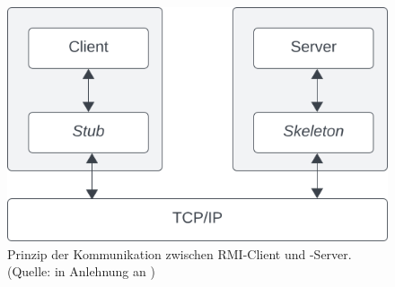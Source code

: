 \begin{figure}
    \centering
    \includegraphics[scale=0.4]{chapters/fopt5/img/rmi/stubskeleton}
    \caption{Prinzip der Kommunikation zwischen RMI-Client und -Server. (Quelle: in Anlehnung an \cite[312, Bild 6.3]{Oec22})}
    \label{fig:stubskeleton}
\end{figure}

